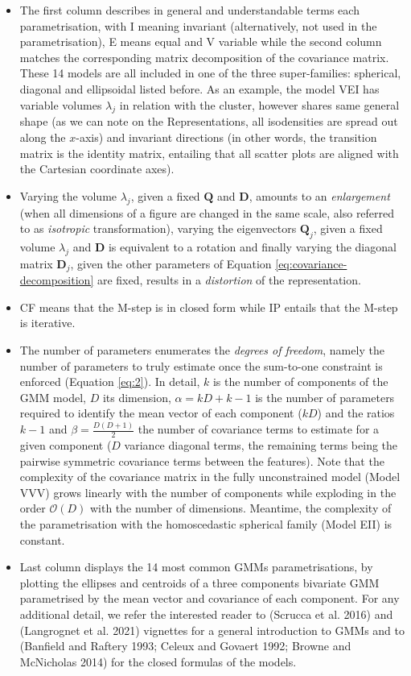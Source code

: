 \begin{itemize}
\item
  The first column describes in general and understandable terms each parametrisation, with I meaning invariant (alternatively, not used in the parametrisation), E means equal and V variable while the second column matches the corresponding matrix decomposition of the covariance matrix. These 14 models are all included in one of the three super-families: spherical, diagonal and ellipsoidal listed before. As an example, the model VEI has variable volumes \(\lambda_j\) in relation with the cluster, however shares same general shape (as we can note on the Representations, all isodensities are spread out along the \(x\)-axis) and invariant directions (in other words, the transition matrix is the identity matrix, entailing that all scatter plots are aligned with the Cartesian coordinate axes).
\item
  Varying the volume \(\lambda_j\), given a fixed \(\boldsymbol{Q}\) and \(\boldsymbol{D}\), amounts to an \emph{enlargement} (when all dimensions of a figure are changed in the same scale, also referred to as \emph{isotropic} transformation), varying the eigenvectors \(\boldsymbol{Q}_j\), given a fixed volume \(\lambda_j\) and \(\boldsymbol{D}\) is equivalent to a rotation and finally varying the diagonal matrix \(\boldsymbol{D}_j\), given the other parameters of Equation \eqref{eq:covariance-decomposition} are fixed, results in a \emph{distortion} of the representation.
\item
  CF means that the M-step is in closed form while IP entails that the M-step is iterative.
\item
  The number of parameters enumerates the \emph{degrees of freedom}, namely the number of parameters to truly estimate once the sum-to-one constraint is enforced (Equation \eqref{eq:2}). In detail, \(k\) is the number of components of the GMM model, \(D\) its dimension, \(\alpha=kD + k - 1\) is the number of parameters required to identify the mean vector of each component (\(kD\)) and the ratios \(k-1\) and \(\beta=\frac{D(D+1)}{2}\) the number of covariance terms to estimate for a given component (\(D\) variance diagonal terms, the remaining terms being the pairwise symmetric covariance terms between the features). Note that the complexity of the covariance matrix in the fully unconstrained model (Model VVV) grows linearly with the number of components while exploding in the order \(\mathcal{O}(D)\) with the number of dimensions. Meantime, the complexity of the parametrisation with the homoscedastic spherical family (Model EII) is constant.
\item
  Last column displays the 14 most common GMMs parametrisations, by plotting the ellipses and centroids of a three components bivariate GMM parametrised by the mean vector and covariance of each component. For any additional detail, we refer the interested reader to  (Scrucca et al. 2016) and  (Langrognet et al. 2021) vignettes for a general introduction to GMMs and to (Banfield and Raftery 1993; Celeux and Govaert 1992; Browne and McNicholas 2014) for the closed formulas of the models.
\end{itemize}


